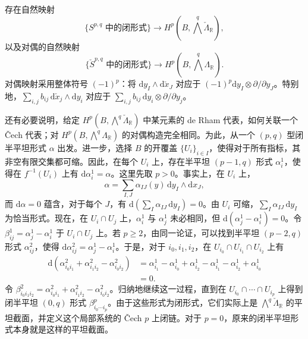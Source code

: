 \begin{proposition}\label{prop:6.20}
存在自然映射
\[
\{S^{p,q}\text{ 中的闭形式}\}
\longrightarrow H^p\!\left(B,\bigwedge^q\check\Lambda_{\mathbb R}\right),
\]
以及对偶的自然映射
\[
\{\check S^{p,q}\text{ 中的闭形式}\}
\longrightarrow H^p\!\left(B,\bigwedge^q\Lambda_{\mathbb R}\right).
\]
对偶映射采用整体符号 $(-1)^p$：将 $\mathrm dy_I\wedge\mathrm d\check x_J$ 对应于 $(-1)^p\mathrm dy_I\otimes\partial/\partial y_J$。特别地，$\sum_{i,j}b_{ij}\,\mathrm d\check x_j\wedge\mathrm dy_i$ 对应于 $\sum_{i,j}b_{ij}\,\mathrm dy_i\otimes\partial/\partial y_j$。
\end{proposition}

还有必要说明，给定 $H^p(B,\bigwedge^q\check\Lambda_{\mathbb R})$ 中某元素的 de Rham 代表，如何关联一个 Čech 代表；对 $H^p(B,\bigwedge^q\Lambda_{\mathbb R})$ 的对偶构造完全相同。为此，从一个 $(p,q)$ 型闭半平坦形式 $\alpha$ 出发。进一步，选择 $B$ 的开覆盖 $\{U_i\}_{i\in I}$，使得对于所有指标，其非空有限交集都可缩。因此，在每个 $U_i$ 上，存在半平坦 $(p-1,q)$ 形式 $\alpha_i^1$，使得在 $f^{-1}(U_i)$ 上有 $\mathrm d\alpha_i^1=\alpha$。这里先取 $p>0$。事实上，在 $U_i$ 上，
\[
\alpha=\sum_{I,J}\alpha_{IJ}(y)\,\mathrm dy_I\wedge\mathrm dx_J,
\]
而 $\mathrm d\alpha=0$ 蕴含，对于每个 $J$，有 $\mathrm d(\sum_I\alpha_{IJ}\,\mathrm dy_I)=0$。由 $U_i$ 可缩，$\sum_I\alpha_{IJ}\,\mathrm dy_I$ 为恰当形式。现在，在 $U_i\cap U_j$ 上，$\alpha_i^1$ 与 $\alpha_j^1$ 未必相同，但 $\mathrm d(\alpha_j^1-\alpha_i^1)=0$。令 $\beta_{ij}^1=\alpha_j^1-\alpha_i^1$ 于 $U_i\cap U_j$ 上。若 $p\geq2$，由同一论证，可以找到半平坦 $(p-2,q)$ 形式 $\alpha_{ij}^2$，使得 $\mathrm d\alpha_{ij}^2=\alpha_j^1-\alpha_i^1$。于是，对于 $i_0,i_1,i_2$，在 $U_{i_0}\cap U_{i_1}\cap U_{i_2}$ 上有
\[
\begin{aligned}
\mathrm d(\alpha_{i_0i_1}^2+\alpha_{i_1i_2}^2-\alpha_{i_0i_2}^2)
&=\alpha_{i_1}^1-\alpha_{i_0}^1+\alpha_{i_2}^1-\alpha_{i_1}^1
-\alpha_{i_2}^1+\alpha_{i_0}^1\\
&=0.
\end{aligned}
\]
令 $\beta_{i_0i_1i_2}^2=\alpha_{i_0i_1}^2+\alpha_{i_1i_2}^2-\alpha_{i_0i_2}^2$。归纳地继续这一过程，直到在 $U_{i_0}\cap\cdots\cap U_{i_p}$ 上得到闭半平坦 $(0,q)$ 形式 $\beta_{i_0\cdots i_p}^p$。由于这些形式为闭形式，它们实际上是 $\bigwedge^q\check\Lambda_{\mathbb R}$ 的平坦截面，并定义这个局部系统的 Čech $p$ 上闭链。对于 $p=0$，原来的闭半平坦形式本身就是这样的平坦截面。

